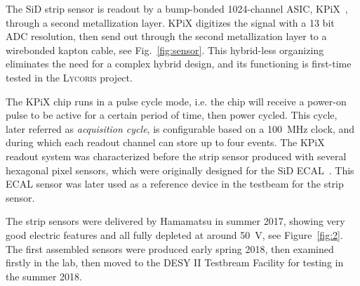 \documentclass[conference]{IEEEtran}
\def\lycoris{\textsc{Lycoris }}%
\begin{document}
The SiD strip sensor is readout by a bump-bonded 1024-channel ASIC, KPiX~\cite{kpix}, through a second metallization layer.
KPiX digitizes the signal with a 13 bit ADC resolution, then send out through the second metallization layer to a wirebonded kapton cable, see Fig.~\ref{fig:sensor}.
This hybrid-less organizing eliminates the need for a complex hybrid design, and its functioning is first-time tested in the \lycoris project.

The KPiX chip runs in a pulse cycle mode, i.e. the chip will receive a power-on pulse to be active for a certain period of time, then power cycled.
This cycle, later referred as \textit{acquisition cycle}, is configurable based on a \SI{100}{MHz} clock, and during which each readout channel can store up to four events.
The KPiX readout system was characterized before the strip sensor produced with several hexagonal pixel sensors, which were originally designed for the SiD ECAL~\cite{Behnke:2013lya}.
This ECAL sensor was later used as a reference device in the testbeam for the strip sensor.

The strip sensors were delivered by Hamamatsu in summer 2017, showing very good electric features and all fully depleted at around \SI{50}{\volt}, see Figure~\ref{fig:2}.
The first assembled sensors were produced early spring 2018, then examined firstly in the lab, then moved to the DESY II Testbream Facility for testing in the summer 2018.
\end{document}
